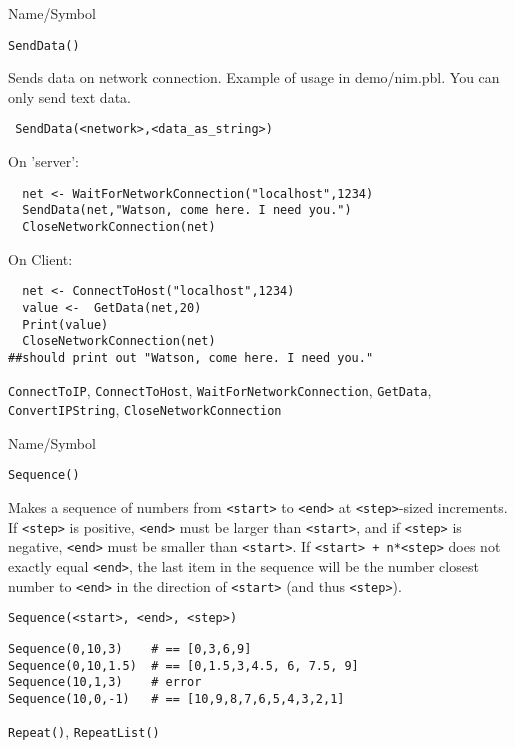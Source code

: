 \rl

\begin{desc}{Name/Symbol}
\item[Name/Symbol]	\verb+SendData()+

\item[Description]	Sends data on network connection.  Example of
  usage in demo/nim.pbl. You can only send text data.

\item[Usage]
\begin{verbatim}
 SendData(<network>,<data_as_string>)
\end{verbatim}

\item[Example]	

On 'server':
\begin{verbatim}
  net <- WaitForNetworkConnection("localhost",1234)
  SendData(net,"Watson, come here. I need you.")
  CloseNetworkConnection(net)
\end{verbatim}
On Client:
\begin{verbatim}
  net <- ConnectToHost("localhost",1234)
  value <-  GetData(net,20)
  Print(value)
  CloseNetworkConnection(net)
##should print out "Watson, come here. I need you."
\end{verbatim}
\item[See Also]
  \verb+ConnectToIP+, \verb+ConnectToHost+, \verb+WaitForNetworkConnection+, \verb+GetData+, \verb+ConvertIPString+, \verb+CloseNetworkConnection+
\end{desc}

\rl


\begin{desc}{Name/Symbol}
\item[Name/Symbol]   	\verb+Sequence()+

\item[Description] Makes a sequence of numbers from \verb+<start>+ to
  \verb+<end>+ at \verb+<step>+-sized increments. If \verb+<step>+ is
  positive, \verb+<end>+ must be larger than \verb+<start>+, and if
  \verb+<step>+ is negative, \verb+<end>+ must be smaller than
  \verb+<start>+. If \verb!<start> + n*<step>! does not exactly equal
  \verb+<end>+, the last item in the sequence will be the number
  closest number to \verb+<end>+ in the direction of \verb+<start>+
  (and thus \verb+<step>+).

\item[Usage] 
\begin{verbatim}
Sequence(<start>, <end>, <step>)
\end{verbatim}

\item[Example]
\begin{verbatim}
Sequence(0,10,3)    # == [0,3,6,9]
Sequence(0,10,1.5)  # == [0,1.5,3,4.5, 6, 7.5, 9]
Sequence(10,1,3)    # error
Sequence(10,0,-1)   # == [10,9,8,7,6,5,4,3,2,1]
\end{verbatim}

\item[See Also]    	\verb+Repeat()+, \verb+RepeatList()+
\end{desc}

